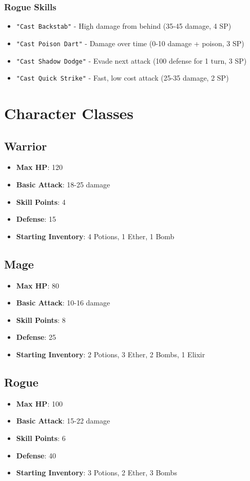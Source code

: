 \documentclass[12pt]{article}
\begin{document}
\subsubsection{Rogue Skills}
\begin{itemize}
    \item \texttt{"Cast Backstab"} - High damage from behind (35-45 damage, 4 SP)
    \item \texttt{"Cast Poison Dart"} - Damage over time (0-10 damage + poison, 3 SP)
    \item \texttt{"Cast Shadow Dodge"} - Evade next attack (100 defense for 1 turn, 3 SP)
    \item \texttt{"Cast Quick Strike"} - Fast, low cost attack (25-35 damage, 2 SP)
\end{itemize}

\section{Character Classes}
\label{sec:character-classes}

\subsection{Warrior}
\begin{itemize}
    \item \textbf{Max HP}: 120
    \item \textbf{Basic Attack}: 18-25 damage
    \item \textbf{Skill Points}: 4
    \item \textbf{Defense}: 15
    \item \textbf{Starting Inventory}: 4 Potions, 1 Ether, 1 Bomb
\end{itemize}

\subsection{Mage}
\begin{itemize}
    \item \textbf{Max HP}: 80
    \item \textbf{Basic Attack}: 10-16 damage
    \item \textbf{Skill Points}: 8
    \item \textbf{Defense}: 25
    \item \textbf{Starting Inventory}: 2 Potions, 3 Ether, 2 Bombs, 1 Elixir
\end{itemize}

\subsection{Rogue}
\begin{itemize}
    \item \textbf{Max HP}: 100
    \item \textbf{Basic Attack}: 15-22 damage
    \item \textbf{Skill Points}: 6
    \item \textbf{Defense}: 40
    \item \textbf{Starting Inventory}: 3 Potions, 2 Ether, 3 Bombs
\end{itemize}
\end{document}
